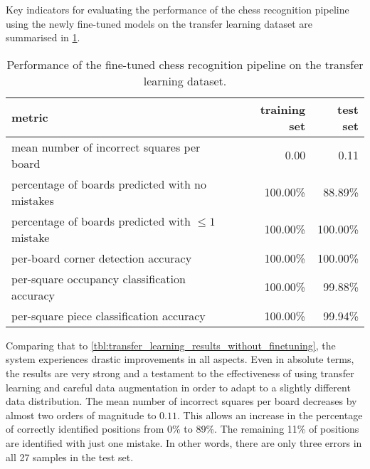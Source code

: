 \documentclass[../report.tex]{subfiles}
\begin{document}
Key indicators for evaluating the performance of the chess recognition pipeline using the newly fine-tuned models on the transfer learning dataset are summarised in \cref{tbl:transfer_learning_results}.
\begin{table}
    \centering
    \begin{tabular}{lrr}
        \toprule
        metric & training set & test set \\
        \midrule
        mean number of incorrect squares per board           & 0.00     & 0.11 \\
        percentage of boards predicted with no mistakes      & 100.00\% & 88.89\%   \\
        percentage of boards predicted with $\leq 1$ mistake & 100.00\% & 100.00\%   \\
        per-board corner detection accuracy                  & 100.00\% & 100.00\% \\
        per-square occupancy classification accuracy         & 100.00\% & 99.88\% \\
        per-square piece classification accuracy             & 100.00\% & 99.94\% \\
        \bottomrule
    \end{tabular}
    \caption{Performance of the fine-tuned chess recognition pipeline on the transfer learning dataset.}
    \label{tbl:transfer_learning_results}
\end{table}
Comparing that to \cref{tbl:transfer_learning_results_without_finetuning}, the system experiences drastic improvements in all aspects.
Even in absolute terms, the results are very strong and a testament to the effectiveness of using transfer learning and careful data augmentation in order to adapt to a slightly different data distribution.
The mean number of incorrect squares per board decreases by almost two orders of magnitude to $0.11$.
This allows an increase in the percentage of correctly identified positions from 0\% to 89\%. 
The remaining 11\% of positions are identified with just one mistake.
In other words, there are only three errors in all 27 samples in the test set.
\end{document}
